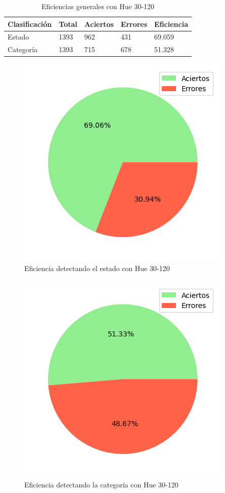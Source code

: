 \begin{table}[H]
\centering
\begin{tabular}{|l|l|l|l|l|}
\hline 
\textbf{Clasificación} & \textbf{Total} & \textbf{Aciertos} & \textbf{Errores} & \textbf{Eficiencia} \\
\hline
Estado & 1393 & 962 & 431 & 69.059 \\
\hline 
Categoría & 1393 & 715 & 678 & 51.328 \\
\hline 
\end{tabular}
\caption{Eficiencias generales con Hue 30-120}
\label{table:efficiency_general_30_120}
\end{table}

\captionsetup[figure]{skip=-10pt}

\begin{figure}[H]
\centering
\includegraphics[scale=0.6]{images/result_global_state_30_120.png}
\caption{Eficiencia detectando el estado con Hue 30-120}
\label{img:efficiency_state_30_120}
\end{figure}

\begin{figure}[H]
\centering
\includegraphics[scale=0.6]{images/result_global_class_30_120.png}
\caption{Eficiencia detectando la categoría con Hue 30-120}
\label{img:efficiency_category_30_120}
\end{figure}


